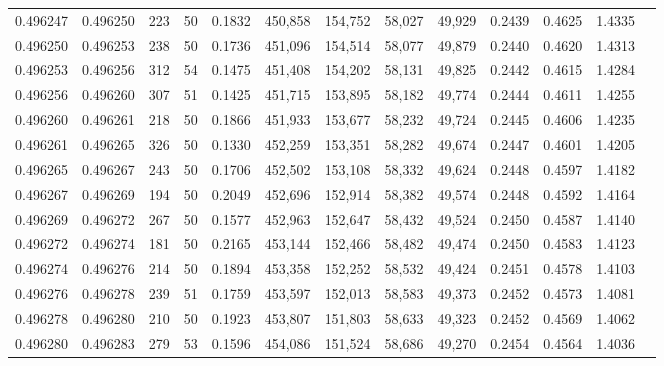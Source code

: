 \begin{tabular}{rrrrrrrrrrrrr}
0.496247 & 0.496250 &   223 &  50 &                                     0.1832 & 450,858 & 154,752 &  58,027 &  49,929 & 0.2439 & 0.4625 & 1.4335 \\
0.496250 & 0.496253 &   238 &  50 &                                     0.1736 & 451,096 & 154,514 &  58,077 &  49,879 & 0.2440 & 0.4620 & 1.4313 \\
0.496253 & 0.496256 &   312 &  54 &                                     0.1475 & 451,408 & 154,202 &  58,131 &  49,825 & 0.2442 & 0.4615 & 1.4284 \\
0.496256 & 0.496260 &   307 &  51 &                                     0.1425 & 451,715 & 153,895 &  58,182 &  49,774 & 0.2444 & 0.4611 & 1.4255 \\
0.496260 & 0.496261 &   218 &  50 &                                     0.1866 & 451,933 & 153,677 &  58,232 &  49,724 & 0.2445 & 0.4606 & 1.4235 \\
0.496261 & 0.496265 &   326 &  50 &                                     0.1330 & 452,259 & 153,351 &  58,282 &  49,674 & 0.2447 & 0.4601 & 1.4205 \\
0.496265 & 0.496267 &   243 &  50 &                                     0.1706 & 452,502 & 153,108 &  58,332 &  49,624 & 0.2448 & 0.4597 & 1.4182 \\
0.496267 & 0.496269 &   194 &  50 &                                     0.2049 & 452,696 & 152,914 &  58,382 &  49,574 & 0.2448 & 0.4592 & 1.4164 \\
0.496269 & 0.496272 &   267 &  50 &                                     0.1577 & 452,963 & 152,647 &  58,432 &  49,524 & 0.2450 & 0.4587 & 1.4140 \\
0.496272 & 0.496274 &   181 &  50 &                                     0.2165 & 453,144 & 152,466 &  58,482 &  49,474 & 0.2450 & 0.4583 & 1.4123 \\
0.496274 & 0.496276 &   214 &  50 &                                     0.1894 & 453,358 & 152,252 &  58,532 &  49,424 & 0.2451 & 0.4578 & 1.4103 \\
0.496276 & 0.496278 &   239 &  51 &                                     0.1759 & 453,597 & 152,013 &  58,583 &  49,373 & 0.2452 & 0.4573 & 1.4081 \\
0.496278 & 0.496280 &   210 &  50 &                                     0.1923 & 453,807 & 151,803 &  58,633 &  49,323 & 0.2452 & 0.4569 & 1.4062 \\
0.496280 & 0.496283 &   279 &  53 &                                     0.1596 & 454,086 & 151,524 &  58,686 &  49,270 & 0.2454 & 0.4564 & 1.4036 \\

\end{tabular}
